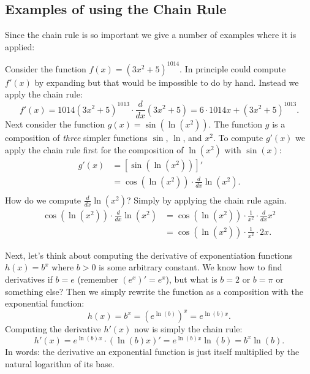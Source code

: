 \subsection{Examples of using the Chain Rule}


Since the chain rule is so important we give a number of examples where it is
applied:

\begin{bsp}
Consider the function $f(x) = (3x^2+5)^{1014}$. In principle could compute
$f'(x)$ by expanding but that would be impossible to do by hand. Instead we
apply the chain rule:
\[
f'(x) = 1014(3x^2+5)^{1013} \cdot \frac{d}{dx}(3x^2+5) = 6 \cdot 1014 x + (3x^2+5)^{1013}.
\]
Next consider the function $g(x) = \sin(\ln(x^2))$. The function $g$ is a
composition of \textit{three} simpler functions $\sin$, $\ln$, and $x^2$. To
compute $g'(x)$ we apply the chain rule first for the composition of
$\ln(x^2)$ with $\sin(x)$:
\begin{equation*}
\begin{split}
g'(x) &= [\sin(\ln(x^2))]' \\
&= \cos(\ln(x^2)) \cdot \frac{d}{dx}\ln(x^2). \\
\end{split}
\end{equation*}
How do we compute $\frac{d}{dx}\ln(x^2)$? Simply by applying the chain rule
again.
\begin{equation*}
\begin{split}
\cos(\ln(x^2)) \cdot \frac{d}{dx}\ln(x^2) &= \cos(\ln(x^2)) \cdot \frac{1}{x^2} \cdot \frac{d}{dx}x^2 \\
&= \cos(\ln(x^2)) \cdot \frac{1}{x^2} \cdot 2x.
\end{split}
\end{equation*}
\end{bsp}

\begin{bsp}
Next, let's think about computing the derivative of exponentiation functions
$h(x) = b^x$ where $b > 0$ is some arbitrary constant. We know how to find
derivatives if $b=e$
(remember $(e^x)' = e^x$), but what is $b=2$ or $b=\pi$ or something else?
Then we simply rewrite the function as a composition with the exponential
function:
\[
h(x) = b^x = {(e^{\ln(b)})}^x = e^{\ln(b)x}.
\]
Computing the derivative $h'(x)$ now is simply the chain rule:
\[
h'(x) = e^{\ln(b)x} \cdot (\ln(b)x)' = e^{\ln(b)x}\ln(b) = b^x\ln(b).
\]
In words: the derivative an exponential function is just itself multiplied by
the natural logarithm of its base.
\end{bsp}

